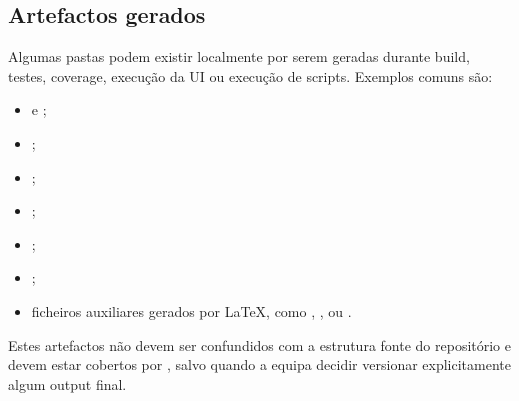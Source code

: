 \subsection{Artefactos gerados}

Algumas pastas podem existir localmente por serem geradas durante build, testes, coverage, execução da UI ou execução de scripts. Exemplos comuns são:

\begin{itemize}
    \item {} e ;
    \item {};
    \item {};
    \item {};
    \item {};
    \item {};
    \item ficheiros auxiliares gerados por LaTeX, como , ,  ou .
\end{itemize}

Estes artefactos não devem ser confundidos com a estrutura fonte do repositório e devem estar cobertos por , salvo quando a equipa decidir versionar explicitamente algum output final.
